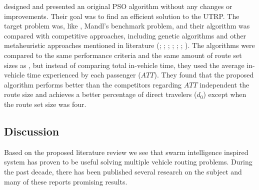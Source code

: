 \citet{kechagiopoulos14} designed and presented an original PSO algorithm without any changes or improvements. Their goal was to find an efficient solution to the UTRP. The target problem was, like \citet{nikolic14}, Mandl's benchmark problem, and their algorithm was compared with competitive approaches, including genetic algorithms and other metaheuristic approaches mentioned in literature (\citet{baaj91}; \citet{chakroborty02}; \citet{kidwai98}; \citet{fan10}; \citet{fan09-2}; \citet{zhang10}; \citet{chew12}). The algorithms were compared to the same performance criteria and the same amount of route set sizes as \citet{nikolic14}, but instead of comparing total in-vehicle time, they used the average in-vehicle time experienced by each passenger ($ATT$). They found that the proposed algorithm performs better than the competitors regarding $ATT$ independent the route size and achieves a better percentage of direct travelers ($d_0$) except when the route set size was four. 

\subsection{Discussion}

Based on the proposed literature review we see that swarm intelligence inspired system has proven to be useful solving multiple vehicle routing problems. During the past decade, there has been published several research on the subject and many of these reports promising results. 

